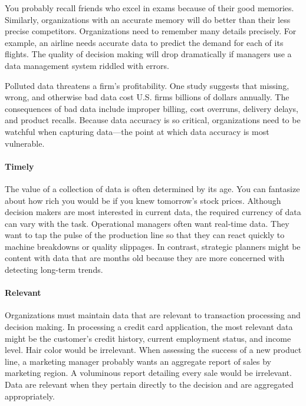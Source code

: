 \documentclass[
]{article}
\begin{document}
You probably recall friends who excel in exams because of their good
memories. Similarly, organizations with an accurate memory will do
better than their less precise competitors. Organizations need to
remember many details precisely. For example, an airline needs accurate
data to predict the demand for each of its flights. The quality of
decision making will drop dramatically if managers use a data management
system riddled with errors.

Polluted data threatens a firm's profitability. One study suggests that
missing, wrong, and otherwise bad data cost U.S. firms billions of
dollars annually. The consequences of bad data include improper billing,
cost overruns, delivery delays, and product recalls. Because data
accuracy is so critical, organizations need to be watchful when
capturing data---the point at which data accuracy is most vulnerable.

\hypertarget{timely}{%
\paragraph*{Timely}\label{timely}}

The value of a collection of data is often determined by its age. You
can fantasize about how rich you would be if you knew tomorrow's stock
prices. Although decision makers are most interested in current data,
the required currency of data can vary with the task. Operational
managers often want real-time data. They want to tap the pulse of the
production line so that they can react quickly to machine breakdowns or
quality slippages. In contrast, strategic planners might be content with
data that are months old because they are more concerned with detecting
long-term trends.

\hypertarget{relevant}{%
\paragraph*{Relevant}\label{relevant}}

Organizations must maintain data that are relevant to transaction
processing and decision making. In processing a credit card application,
the most relevant data might be the customer's credit history, current
employment status, and income level. Hair color would be irrelevant.
When assessing the success of a new product line, a marketing manager
probably wants an aggregate report of sales by marketing region. A
voluminous report detailing every sale would be irrelevant. Data are
relevant when they pertain directly to the decision and are aggregated
appropriately.
\end{document}
